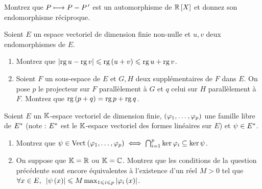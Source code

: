 \begin{corr}
\end{corr}

\begin{exo}
Montrez que \(P\longmapsto P-P^{\,\prime}\) est un automorphisme de \(\poly[\R]\) et donnez son endomorphisme réciproque.
\end{exo}

\begin{corr}
\end{corr}

\begin{exo}
Soient \(E\) un espace vectoriel de dimension finie non-nulle et \(u,v\) deux endomorphismes de \(E\).

\begin{enumerate}
    \item Montrez que \(\left\lvert\operatorname{rg} u-\operatorname{rg} v\right\rvert\leqslant\operatorname{rg}\left(u+v\right)\leqslant\operatorname{rg} u+\operatorname{rg} v\). \\
    \item Soient \(F\) un sous-espace de \(E\) et \(G,H\) deux supplémentaires de \(F\) dans \(E\). On pose \(p\) le projecteur sur \(F\) parallèlement à \(G\) et \(q\) celui sur \(H\) parallèlement à \(F\). Montrez que \(\operatorname{rg}\left(p+q\right)=\operatorname{rg} p+\operatorname{rg} q\).
\end{enumerate}
\end{exo}

\begin{corr}
\end{corr}

\begin{exo}
Soient \(E\) un \(\mathbb{K}\)-espace vectoriel de dimension finie, \(\left(\varphi_1,\dots,\varphi_p\right)\) une famille libre de \(E^{*}\) (note : \(E^{*}\) est le \(\mathbb{K}\)-espace vectoriel des formes linéaires sur \(E\)) et \(\psi\in E^{*}\).

\begin{enumerate}
    \item Montrez que \(\psi\in\Vect{\phi_1,\dots,\phi_p}\ssi\biginter_{i=1}^p\ker\phi_i\subset\ker\psi\). \\
    \item On suppose que \(\mathbb{K}=\mathbb{R}\) ou \(\mathbb{K}=\mathbb{C}\). Montrez que les conditions de la question précédente sont encore équivalentes à l'existence d'un réel \(M>0\) tel que \(\quantifs{\forall x\in E}\abs{\psi\paren{x}}\leq M\max_{1\leq i\leq p}\abs{\phi_i\paren{x}}\).
\end{enumerate}
\end{exo}

